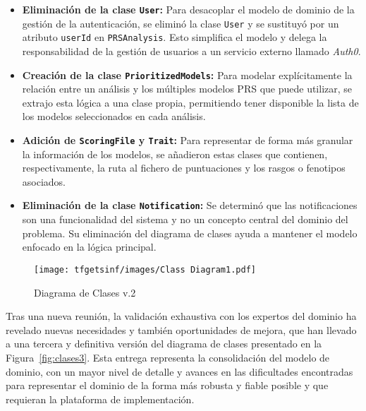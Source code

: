 \begin{itemize} 

    \item \textbf{Eliminación de la clase \texttt{User}:} Para desacoplar el modelo de dominio de la gestión de la autenticación, se eliminó la clase \texttt{User} y se sustituyó por un atributo \texttt{userId} en \texttt{PRSAnalysis}. Esto simplifica el modelo y delega la responsabilidad de la gestión de usuarios a un servicio externo llamado \textit{Auth0}. 

    \item \textbf{Creación de la clase \texttt{PrioritizedModels}:} Para modelar explícitamente la relación entre un análisis y los múltiples modelos PRS que puede utilizar, se extrajo esta lógica a una clase propia, permitiendo tener disponible la lista de los modelos seleccionados en cada análisis. 

    \item \textbf{Adición de \texttt{ScoringFile} y \texttt{Trait}:} Para representar de forma más granular la información de los modelos, se añadieron estas clases que contienen, respectivamente, la ruta al fichero de puntuaciones y los rasgos o fenotipos asociados. 

    \item \textbf{Eliminación de la clase \texttt{Notification}:} Se determinó que las notificaciones son una funcionalidad del sistema y no un concepto central del dominio del problema. Su eliminación del diagrama de clases ayuda a mantener el modelo enfocado en la lógica principal. 

\end{itemize} 

\begin{figure}[H]
    \centering
    \texttt{[image: tfgetsinf/images/Class Diagram1.pdf]}
    \caption{Diagrama de Clases v.2}
    \label{fig:clases2}
\end{figure}

Tras una nueva reunión, la validación exhaustiva con los expertos del dominio ha revelado nuevas necesidades y también oportunidades de mejora, que han llevado a una tercera y definitiva versión del diagrama de clases presentado en la Figura~\ref{fig:clases3}. Esta entrega representa la consolidación del modelo de dominio, con un mayor nivel de detalle y avances en las dificultades encontradas para representar el dominio de la forma más robusta y fiable posible y que requieran la plataforma de implementación. 

